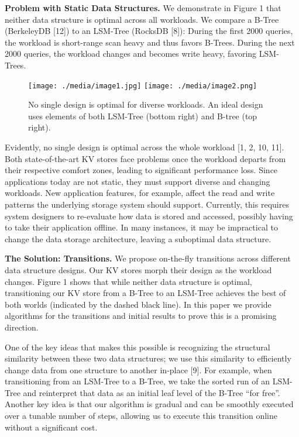 \documentclass[a4paper,12pt,notitlepage,twoside,openright]{article}
\begin{document}
\textbf{Problem with Static Data Structures.} We demonstrate in Figure 1 that
neither data structure is optimal across all workloads. We compare a
B-Tree (BerkeleyDB {[}12{]}) to an LSM-Tree (RocksDB {[}8{]}): During
the first 2000 queries, the workload is short-range scan heavy and thus
favors B-Trees. During the next 2000 queries, the workload changes and
becomes write heavy, favoring LSM-Trees.

\begin{figure}
  \centering
  \begin{minipage}[t]{0.9\columnwidth}
    \texttt{[image: ./media/image1.jpg]}
    \texttt{[image: ./media/image2.png]}
  \end{minipage}
  \caption{No single design is optimal for diverse workloads. An ideal
design uses elements of both LSM-Tree (bottom right) and B-tree (top
right).}
\end{figure}

Evidently, no single design is optimal across the whole workload {[}1,
2, 10, 11{]}. Both state-of-the-art KV stores face problems once the
workload departs from their respective comfort zones, leading to
significant performance loss. Since applications today are not static,
they must support diverse and changing workloads. New application
features, for example, affect the read and write patterns the underlying
storage system should support. Currently, this requires system designers
to re-evaluate how data is stored and accessed, possibly having to take
their application offline. In many instances, it may be impractical to
change the data storage architecture, leaving a suboptimal data
structure.

\textbf{The Solution: Transitions.} We propose on-the-fly transitions across
different data structure designs. Our KV stores morph their design as
the workload changes. Figure 1 shows that while neither data structure
is optimal, transitioning our KV store from a B-Tree to an LSM-Tree
achieves the best of both worlds (indicated by the dashed black line).
In this paper we provide algorithms for the transitions and initial
results to prove this is a promising direction.

One of the key ideas that makes this possible is recognizing the
structural similarity between these two data structures; we use this
similarity to efficiently change data from one structure to another
in-place {[}9{]}. For example, when transitioning from an LSM-Tree to a
B-Tree, we take the sorted run of an LSM-Tree and reinterpret that data
as an initial leaf level of the B-Tree ``for free''. Another key idea is
that our algorithm is gradual and can be smoothly executed over a
tunable number of steps, allowing us to execute this transition online
without a significant cost.
\end{document}
